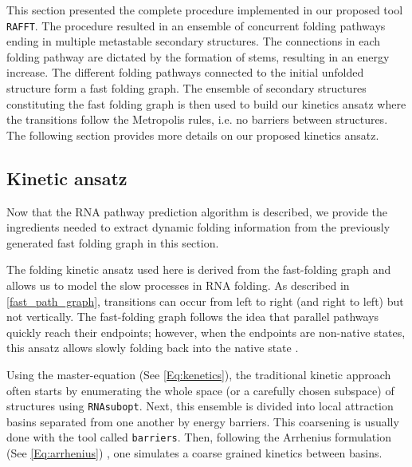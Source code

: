 This section presented the complete procedure implemented in our proposed tool \texttt{RAFFT}. The procedure resulted in an ensemble of concurrent folding pathways ending in multiple metastable secondary structures. The connections in each folding pathway are dictated by the formation of stems, resulting in an energy increase. The different folding pathways connected to the initial unfolded structure form a fast folding graph. The ensemble of secondary structures constituting the fast folding graph is then used to build our kinetics ansatz where the transitions follow the Metropolis rules, i.e. no barriers between structures. The following section provides more details on our proposed kinetics ansatz.
\subsection{Kinetic ansatz}
Now that the RNA pathway prediction algorithm is described, we provide the ingredients needed to extract dynamic folding information from the previously generated fast folding graph in this section.

The folding kinetic ansatz used here is derived from the fast-folding graph and allows us to model the slow processes in \ac{RNA} folding. As described in \autoref{fast_path_graph}, transitions can occur from left to right (and right to left) but not vertically. The fast-folding graph follows the idea that parallel pathways quickly reach their endpoints; however, when the endpoints are non-native states, this ansatz allows slowly folding back into the native state \cite{pan97_foldin_rna_invol_paral_pathw}. 

Using the master-equation (See \autoref{Eq:kenetics}), the traditional kinetic approach often starts by enumerating the whole space (or a carefully chosen subspace) of structures using \texttt{RNAsubopt}. Next, this ensemble is divided into local attraction basins separated from one another by energy barriers. This coarsening is usually done with the tool called \texttt{barriers}. Then, following the Arrhenius formulation (See \autoref{Eq:arrhenius}) , one simulates a coarse grained kinetics between basins.  

